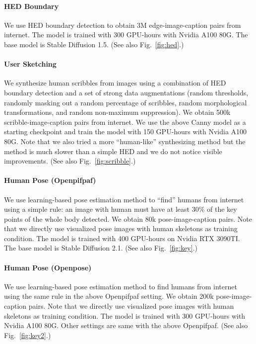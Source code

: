 \documentclass{article}
\begin{document}
\paragraph{HED Boundary} We use HED boundary detection \cite{7410521} to obtain 3M edge-image-caption pairs from internet. The model is trained with 300 GPU-hours with Nvidia A100 80G. The base model is Stable Diffusion 1.5. (See also Fig.~\ref{fig:hed}.)

\paragraph{User Sketching} We synthesize human scribbles from images using a combination of HED boundary detection \cite{7410521} and a set of strong data augmentations (random thresholds, randomly masking out a random percentage of scribbles, random morphological transformations, and random non-maximum suppression). We obtain 500k scribble-image-caption pairs from internet. We use the above Canny model as a starting checkpoint and train the model with 150 GPU-hours with Nvidia A100 80G. Note that we also tried a more ``human-like'' synthesizing method \cite{2211.17256} but the method is much slower than a simple HED and we do not notice visible improvements. (See also Fig.~\ref{fig:scribble}.)

\paragraph{Human Pose (Openpifpaf)} We use learning-based pose estimation method \cite{kreiss2021openpifpaf} to ``find'' humans from internet using a simple rule: an image with human must have at least 30\% of the key points of the whole body detected. We obtain 80k pose-image-caption pairs. Note that we directly use visualized pose images with human skeletons as training condition. The model is trained with 400 GPU-hours on Nvidia RTX 3090TI. The base model is Stable Diffusion 2.1. (See also Fig.~\ref{fig:key}.)

\paragraph{Human Pose (Openpose)} We use learning-based pose estimation method \cite{8765346} to find humans from internet using the same rule in the above Openpifpaf setting. We obtain 200k pose-image-caption pairs. Note that we directly use visualized pose images with human skeletons as training condition. The model is trained with 300 GPU-hours with Nvidia A100 80G. Other settings are same with the above Openpifpaf. (See also Fig.~\ref{fig:key2}.)
\end{document}
